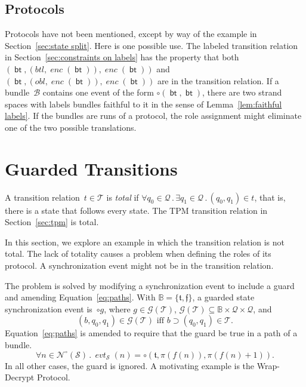 \documentclass[12pt]{article}
\newcommand{\cn}[1]{\ensuremath{\operatorname{\mathsf{#1}}}}
\newcommand{\fn}[1]{\ensuremath{\operatorname{\mathit{#1}}}}
\newcommand{\gtag}[1]{\ensuremath{\mathit{#1}}}
\newcommand{\neutral}{\mathord\circ}
\newcommand{\all}[1]{\forall#1\mathpunct.}
\newcommand{\some}[1]{\exists#1\mathpunct.}
\newcommand{\ssp}{\ensuremath{\mathcal{S}}}
\newcommand{\bun}{\ensuremath{\mathcal{B}}}
\newcommand{\sta}{\ensuremath{\mathcal{Q}}}
\newcommand{\nodes}{\ensuremath{\mathcal{N}}}
\newcommand{\nnodes}{\nodes^{\neutral}}
\newcommand{\boot}{\cn{bt}}
\newcommand{\tran}{\ensuremath{\mathcal{T}}}
\newcommand{\pth}{\ensuremath{\pi}}
\newcommand{\encode}{\fn{enc}}
\newcommand{\evt}{\fn{evt}}
\newcommand{\bool}{\ensuremath{\mathbb{B}}}
\newcommand{\truth}{\ensuremath{\mathfrak{t}}}
\newcommand{\falsehood}{\ensuremath{\mathfrak{f}}}
\newcommand{\gua}{\ensuremath{\mathcal{G}}}
\begin{document}
\subsection{Protocols}\label{sec:protocols}

\begin{sloppypar}
Protocols have not been mentioned, except by way of the example in
Section~\ref{sec:state split}.  Here is one possible use.  The labeled
transition relation in Section~\ref{sec:constraints on labels} has the
property that both $(\boot, (\gtag{btl}, \encode(\boot)),
\encode(\boot))$ and $(\boot, (\gtag{obl}, \encode(\boot)),
\encode(\boot))$ are in the transition relation.  If a bundle~{\bun}
contains one event of the form $\neutral(\boot,\boot)$, there are two
strand spaces with labels bundles faithful to it in the sense of
Lemma~\ref{lem:faithful labels}.  If the bundles are runs of a
protocol, the role assignment might eliminate one of the two possible
translations.
\end{sloppypar}

\section{Guarded Transitions}\label{sec:guarded transitions}

A transition relation~$t\in\tran$ is \emph{total} if
$\all{q_0\in\sta}\some{q_1\in\sta}(q_0,q_1)\in t$, that is, there is
a state that follows every state.  The TPM transition relation in
Section~\ref{sec:tpm} is total.

In this section, we explore an example in which the transition
relation is not total.  The lack of totality causes a problem when
defining the roles of its protocol.  A synchronization event might not
be in the transition relation.

The problem is solved by modifying a synchronization event to include
a guard and amending Equation~\ref{eq:paths}.  With
$\bool=\{\truth,\falsehood\}$, a guarded state synchronization event
is~$\neutral g$, where $g\in\gua(\tran)$,
$\gua(\tran)\subseteq\bool\times\sta\times\sta$, and
\[(b,q_0,q_1)\in\gua(\tran)\mbox{ iff }b\supset (q_0,q_1)\in\tran.\]
Equation~\ref{eq:paths} is amended to require that the guard be true in
a path of a bundle.
\begin{equation}\label{eq:guarded paths}
\all{n\in\nnodes(\ssp)}\evt_\ssp(n)=\neutral(\truth,\pth(f(n)), \pth(f(n)+1)).
\end{equation}
In all other cases, the guard is ignored.  A motivating example is
the Wrap-Decrypt Protocol.
\end{document}
